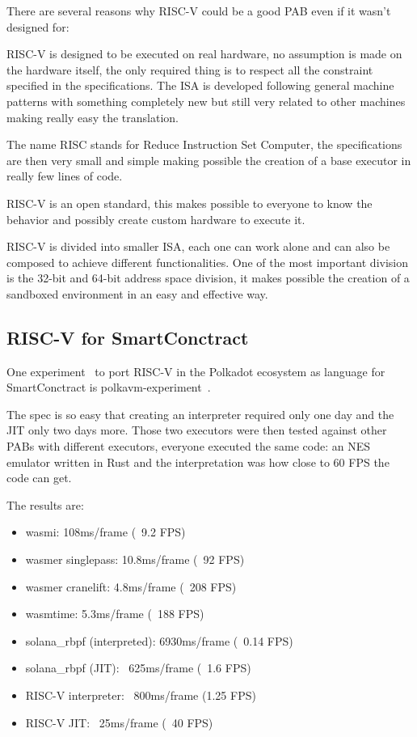 There are several reasons why RISC-V could be a good PAB even if it wasn't designed for:
\begin{description}[style=nextline]
  \item[Real ISA suitable for direct native hardware implementation]
        RISC-V is designed to be executed on real hardware, no assumption is made on the hardware itself, the only required thing is to respect all the constraint specified in the specifications. The ISA is developed following general machine patterns with something completely new but still very related to other machines making really easy the translation.
  \item[RISC]
        The name RISC stands for Reduce Instruction Set Computer, the specifications are then very small and simple making possible the creation of a base executor in really few lines of code.
  \item[Completely open ISA]
        RISC-V is an open standard, this makes possible to everyone to know the behavior and possibly create custom hardware to execute it.
  \item[ISA separated into a small base integer ISA]
        RISC-V is divided into smaller ISA, each one can work alone and can also be composed to achieve different functionalities. One of the most important division is the 32-bit and 64-bit address space division, it makes possible the creation of a sandboxed environment in an easy and effective way.
\end{description}

\subsection{RISC-V for SmartConctract}

One experiment~\cite{polkavm-forum} to port RISC-V in the Polkadot ecosystem as language for SmartConctract is polkavm-experiment~\cite{polkavm-experiment}.

The spec is so easy that creating an interpreter required only one day and the JIT only two days more. Those two executors were then tested against other PABs with different executors, everyone executed the same code: an NES emulator written in Rust and the interpretation was how close to 60 FPS the code can get.

The results are:
\begin{itemize}
    \item wasmi: 108ms/frame (~9.2 FPS)
    \item wasmer singlepass: 10.8ms/frame (~92 FPS)
    \item wasmer cranelift: 4.8ms/frame (~208 FPS)
    \item wasmtime: 5.3ms/frame (~188 FPS)
    \item solana\_rbpf (interpreted): 6930ms/frame (~0.14 FPS)
    \item solana\_rbpf (JIT): ~625ms/frame (~1.6 FPS)
    \item RISC-V interpreter: ~800ms/frame (1.25 FPS)
    \item RISC-V JIT: ~25ms/frame (~40 FPS)
\end{itemize}

